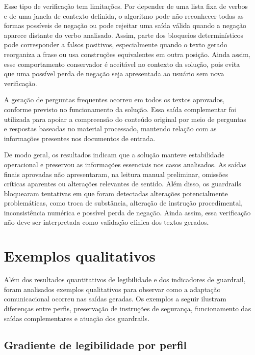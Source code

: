 Esse tipo de verificação tem limitações. Por depender de uma lista fixa de verbos e de uma janela de contexto definida, o algoritmo pode não reconhecer todas as formas possíveis de negação ou pode rejeitar uma saída válida quando a negação aparece distante do verbo analisado. Assim, parte dos bloqueios determinísticos pode corresponder a falsos positivos, especialmente quando o texto gerado reorganiza a frase ou usa construções equivalentes em outra posição. Ainda assim, esse comportamento conservador é aceitável no contexto da solução, pois evita que uma possível perda de negação seja apresentada ao usuário sem nova verificação.

A geração de perguntas frequentes ocorreu em todos os textos aprovados, conforme previsto no funcionamento da solução. Essa saída complementar foi utilizada para apoiar a compreensão do conteúdo original por meio de perguntas e respostas baseadas no material processado, mantendo relação com as informações presentes nos documentos de entrada.

De modo geral, os resultados indicam que a solução manteve estabilidade operacional e preservou as informações essenciais nos casos analisados. As saídas finais aprovadas não apresentaram, na leitura manual preliminar, omissões críticas aparentes ou alterações relevantes de sentido. Além disso, os guardrails bloquearam tentativas em que foram detectadas alterações potencialmente problemáticas, como troca de substância, alteração de instrução procedimental, inconsistência numérica e possível perda de negação. Ainda assim, essa verificação não deve ser interpretada como validação clínica dos textos gerados.

\section{Exemplos qualitativos}
\label{sec:exemplos-qualitativos}

Além dos resultados quantitativos de legibilidade e dos indicadores de guardrail, foram analisados exemplos qualitativos para observar como a adaptação comunicacional ocorreu nas saídas geradas. Os exemplos a seguir ilustram diferenças entre perfis, preservação de instruções de segurança, funcionamento das saídas complementares e atuação dos guardrails.

\subsection{Gradiente de legibilidade por perfil}
\label{subsec:gradiente-legibilidade-perfil}

